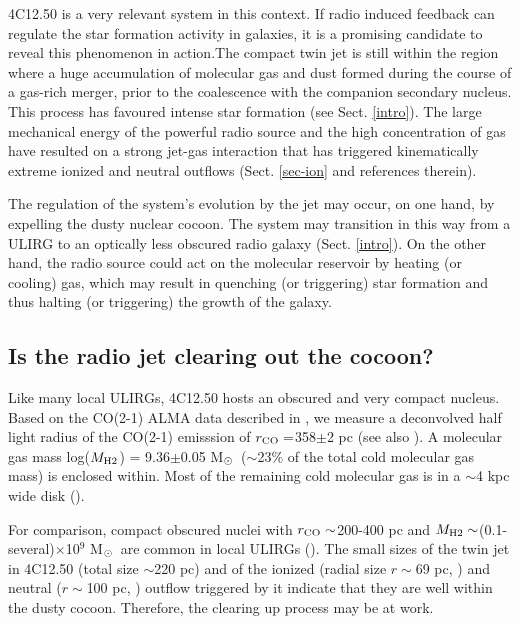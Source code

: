 \documentclass{aa}
\newcommand{\msun}{M$_{\rm \odot}$~}
\begin{document}
 4C12.50 is a very relevant system in this context. If radio induced feedback can regulate the star formation activity in galaxies, it is a promising candidate to reveal this phenomenon in action.The compact twin jet  is still within the region where a huge accumulation of molecular gas and dust formed during the course of a gas-rich merger, prior to  the coalescence with the companion secondary nucleus. This process has favoured intense star formation (see Sect. \ref{intro}).  The large mechanical energy of the powerful radio source and the high concentration of  gas have resulted on a strong jet-gas interaction that has triggered kinematically extreme ionized and neutral outflows (Sect. \ref{sec-ion} and references therein). 


The regulation of the system's evolution by the jet may occur, on one hand, by expelling the dusty nuclear cocoon. The system may transition in this way from a ULIRG to an optically less obscured radio galaxy (Sect. \ref{intro}).  On the other hand, the radio source could act on the molecular reservoir by heating (or cooling) gas, which may result in quenching (or triggering) star formation and thus halting (or triggering) the growth of the galaxy.

\subsection{Is the radio jet clearing out  the cocoon?}
  Like many local ULIRGs, 4C12.50 hosts an obscured and very compact  nucleus.  Based on the CO(2-1) ALMA data described in \cite{Lamperti2022}, we measure   a deconvolved half light radius of the CO(2-1) emisssion of  $r_{\rm CO}=$358$\pm$2 pc (see also \citealt{Evans2002}). A molecular gas mass log($M_{\rm H2}$) = 9.36$\pm$0.05  \msun ($\sim$23\% of the total cold molecular gas mass) is enclosed within.  Most of the remaining cold molecular gas is in a $\sim$4 kpc wide disk (\citealt{Fotopoulou2019}).

 For comparison, compact  obscured nuclei with $r_{\rm CO}\sim$200-400 pc  and $M_{\rm H2}\sim$(0.1-several)$\times$10$^9$ \msun are common in local ULIRGs (\citealt{Condon1991,Soifer2000,Pereira2021}). The small sizes of the twin jet in 4C12.50 (total size $\sim$220 pc) and of the  ionized (radial size $r\sim$69 pc, \citealt{Tadhunter2018}) and neutral ($r\sim$100 pc, \citealt{Morganti2013}) outflow triggered by it   indicate that they   are well within the dusty cocoon. Therefore, the clearing up process may  be at work. 
\end{document}
